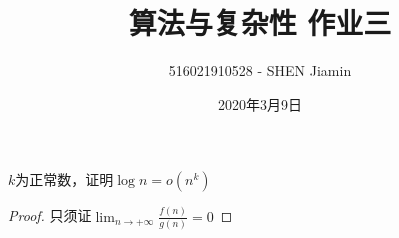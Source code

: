 \documentclass[answers]{exam}
\title{算法与复杂性 \quad 作业三}
\author{516021910528 - SHEN Jiamin}
\date{2020年3月9日}
\begin{document}
\maketitle

\begin{questions}

    \question $k$为正常数，证明$\log{n} = o(n^k)$
    \begin{solution}
        \begin{proof}
        只须证$\lim_{n \rightarrow + \infty} \frac{f(n)}{g(n)} = 0 $
        \end{proof}
    \end{solution}




\end{questions}
\end{document}
